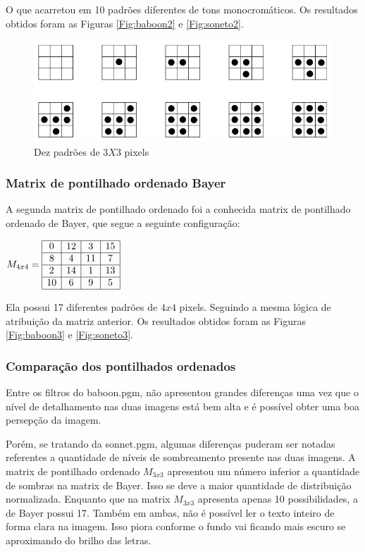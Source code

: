 \documentclass{article}
\begin{document}
O que acarretou em 10 padrões diferentes de tons monocromáticos. Os resultados obtidos foram as Figuras \ref{Fig:baboon2} e \ref{Fig:soneto2}.

\begin{figure}[h!]
    \centering
    \includegraphics[width=0.7\linewidth]{padroes.png}
    \caption{Dez padrões de $3X3$ pixels}
    \label{fig:original}
\end{figure}

\subsubsection{Matrix de pontilhado ordenado Bayer}

A segunda matrix de pontilhado ordenado foi a conhecida matrix de pontilhado ordenado de Bayer, que segue a seguinte configuração:

\begin{center}
$
M_{4x4} = \begin{array}{|c|c|c|c|}
  \hline
  0 & 12 & 3 & 15 \\ 
  \hline
  8 & 4 & 11 & 7 \\  
  \hline
  2 & 14 & 1 & 13 \\ 
  \hline
  10 & 6 & 9 & 5 \\ 
  \hline
 \end{array}
$
\end{center}

Ela possui 17 diferentes padrões de $4x4$ pixels. Seguindo a mesma lógica de atribuição da matriz anterior. Os resultados obtidos foram as Figuras \ref{Fig:baboon3} e \ref{Fig:soneto3}.

\subsubsection{Comparação dos pontilhados ordenados}

Entre os filtros do baboon.pgm, não apresentou grandes diferenças uma vez que o nível de detalhamento nas duas imagens está bem alta e é possível obter uma boa persepção da imagem.

Porém, se tratando da sonnet.pgm, algumas diferenças puderam ser notadas referentes a quantidade de níveis de sombreamento presente nas duas imagens. A matrix de pontilhado ordenado $ M_{3x3} $ apresentou um número inferior a quantidade de sombras na matrix de Bayer. Isso se deve a maior quantidade de distribuição normalizada. Enquanto que na matrix $ M_{3x3} $ apresenta apenas 10 possibilidades, a de Bayer possui 17. Também em ambas, não é possível ler o texto inteiro de forma clara na imagem. Isso piora conforme o fundo vai ficando mais escuro se aproximando do brilho das letras.
\end{document}
